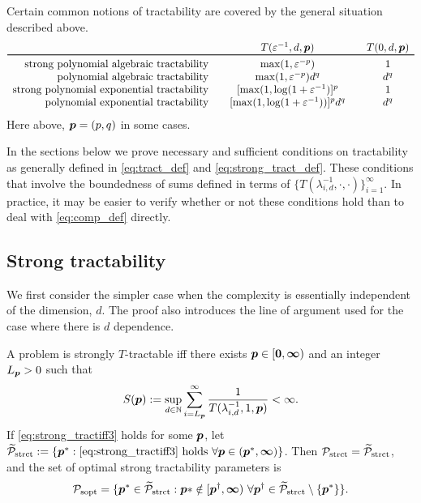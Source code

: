 \documentclass[11pt,a4paper]{article}
\begin{document}
Certain common notions of tractability are covered by the general situation described above.
\begin{equation*}
	\begin{array}{r@{\qquad}c@{\qquad}cc}
		& T(\varepsilon^{-1},d,\vp)
		& T(0,d,\vp)\\
		\toprule
		\text{strong polynomial algebraic  tractability} & \max(1,\varepsilon^{-p}) & 1\\
		\text{polynomial algebraic tractability} & \max(1,\varepsilon^{-p})d^{q} & d^{q}\\
		\text{strong polynomial exponential tractability} &  [\max(1,\log(1 + \varepsilon^{-1})]^p & 1\\
		\text{polynomial exponential tractability} &
		[\max(1,\log(1 + \varepsilon^{-1}))]^p  d^{q} & d^{q}
	\end{array}
\end{equation*}
Here above, $\boldsymbol{p} = (p,q)$ in some cases.


In the sections below we prove necessary and sufficient conditions on tractability as generally defined in \eqref{eq:tract_def} and \eqref{eq:strong_tract_def}.  These conditions  that involve the boundedness of sums defined in terms of $\{T(\lambda_{i,d}^{-1},\cdot, \cdot)\}_{i=1}^\infty$.  In practice, it may be easier to verify whether or not these conditions hold than to deal with \eqref{eq:comp_def} directly.


\subsection{Strong tractability}

We first consider the simpler case when the complexity is essentially independent of the dimension, $d$.  The proof also introduces the line of argument used for the case where there is $d$ dependence.

\begin{theorem}\label{thm_main_strong_tract2}
A problem is strongly $T$-tractable iff there exists $\boldsymbol{p} \in [\boldsymbol{0}, \boldsymbol{\infty})$ and an integer $L_{\boldsymbol{p}} > 0$ such that
\begin{equation} \label{eq:strong_tractiff3}
     S(\boldsymbol{p}):=\sup_{d \in \mathbb{N}} \sum_{i = L_{\boldsymbol{p}}}^\infty \frac{1}{T(\lambda_{i,d}^{-1},1,\boldsymbol{p})} < \infty.
\end{equation}
If \eqref{eq:strong_tractiff3} holds for some $\boldsymbol{p}$, let  $\widetilde{\mathcal{P}}_{\textup{strct}} : = \{\boldsymbol{p}^* : \eqref{eq:strong_tractiff3} \text{ holds }\forall \boldsymbol{p} \in (\boldsymbol{p}^*,\boldsymbol{\infty})\}$.  Then $\mathcal{P}_{\textup{strct}} = \widetilde{\mathcal{P}}_{\textup{strct}}$, and the set of optimal strong tractability parameters is
\[
	\mathcal{P}_{\textup{sopt}} =
	\{\boldsymbol{p}^* \in \widetilde{\mathcal{P}}_{\textup{strct}} :  \boldsymbol{p}* \notin [\boldsymbol{p}^\dagger,\boldsymbol{\infty}) \ \forall \boldsymbol{p}^\dagger \in  \widetilde{\mathcal{P}}_{\textup{strct}} \setminus \{\boldsymbol{p}^*\} \}.
\]
\end{theorem}
\end{document}
